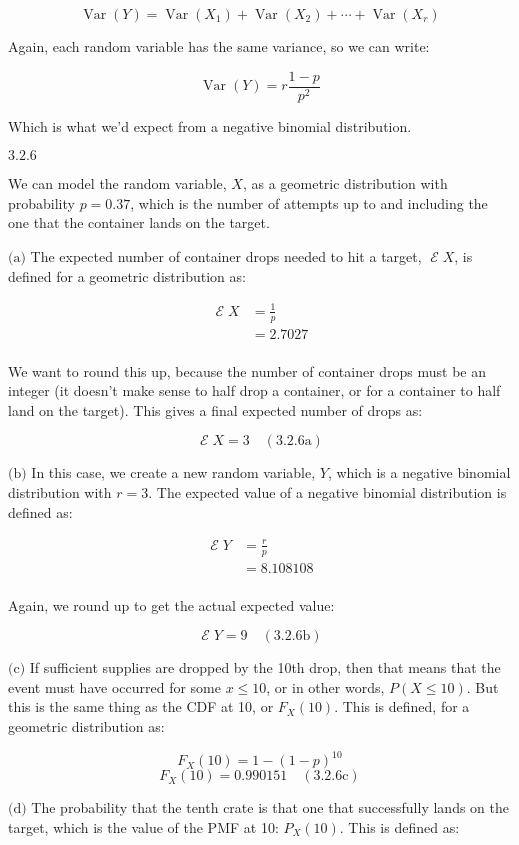 \documentclass{article}
\newcommand{\problem}[2]{$\boxed{\text{#1.#2}}$}
\newcommand{\subproblem}[3]{$\boxed{\text{(#3)}}$}
\newcommand{\subsolution}[4]{\boxed{#4\quad(\text{#1.#2#3})}}
\newcommand{\multistep}[1]{\begin{array}{rl} #1 \end{array}}
\DeclareMathOperator{\var}{Var}
\DeclareMathOperator{\E}{\mathcal{E}}
\begin{document}
\[
\var(Y)=\var(X_1)+\var(X_2)+\cdots+\var(X_r)
\]

Again, each random variable has the same variance, so we can write:

\[
\var(Y)=r\frac{1-p}{p^2}
\]

Which is what we'd expect from a negative binomial distribution.

%
\problem{3.2}{6}

We can model the random variable, $X$, as a geometric distribution
with probability $p=0.37$, which is the number of attempts up to and
including the one that the container lands on the target.

%
\subproblem{3.2}{6}{a} The expected number of container drops needed
to hit a target, $\E{}X$, is defined for a geometric distribution as:

\[
\multistep{
\E X&=\frac{1}{p} \\
&=2.7027 \\
}
\]

We want to round this up, because the number of container drops must
be an integer (it doesn't make sense to half drop a container, or for
a container to half land on the target). This gives a final expected
number of drops as:

\[
\subsolution{3.2}{6}{a}{\E X=3}
\]

%
\subproblem{3.2}{6}{b} In this case, we create a new random variable,
$Y$, which is a negative binomial distribution with $r=3$. The
expected value of a negative binomial distribution is defined as:

\[
\multistep{
\E Y&=\frac{r}{p} \\
&=8.108108 \\
}
\]

Again, we round up to get the actual expected value:

\[
\subsolution{3.2}{6}{b}{\E Y=9}
\]

%
\subproblem{3.2}{6}{c} If sufficient supplies are dropped by the 10th
drop, then that means that the event must have occurred for some
$x\le10$, or in other words, $P(X\le10)$. But this is the same thing
as the CDF at 10, or $F_X(10)$. This is defined, for a geometric
distribution as:

\[
F_X(10)=1-(1-p)^{10}
\] \[
\subsolution{3.2}{6}{c}{F_X(10)=0.990151}
\]

%
\subproblem{3.2}{6}{d} The probability that the tenth crate is that
one that successfully lands on the target, which is the value of the
PMF at 10: $P_X(10)$. This is defined as:
\end{document}
